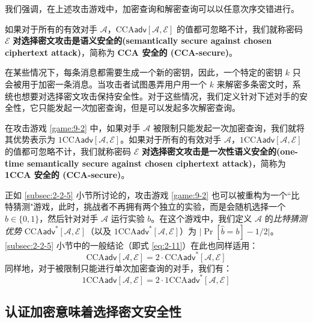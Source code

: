 我们强调，在上述攻击游戏中，加密查询和解密查询可以以任意次序交错进行。

\begin{definition}\label{def:9-5}
如果对于所有的有效对手 $\mathcal{A}$，$\mathrm{CCA}\mathsf{adv}[\mathcal{A},\mathcal{E}]$ 的值都可忽略不计，我们就称密码 $\mathcal{E}$ \textbf{对选择密文攻击是语义安全的(semantically secure against chosen ciphertext attack)}，简称为 \textbf{CCA 安全的 (CCA-secure)}。
\end{definition}

在某些情况下，每条消息都需要生成一个新的密钥，因此，一个特定的密钥 $k$ 只会被用于加密一条消息。当攻击者试图愚弄用户用一个 $k$ 来解密多条密文时，系统也想要对选择密文攻击保持安全性。对于这些情况，我们定义针对下述对手的安全性，它只能发起\emph{一次}加密查询，但是可以发起多次解密查询。

\begin{definition}\label{def:9-6}
在攻击游戏 \ref{game:9-2} 中，如果对手 $\mathcal{A}$ 被限制只能发起一次加密查询，我们就将其优势表示为 $\mathrm{1CCA}\mathsf{adv}[\mathcal{A},\mathcal{E}]$。如果对于所有的有效对手 $\mathcal{A}$，$\mathrm{1CCA}\mathsf{adv}[\mathcal{A},\mathcal{E}]$ 的值都可忽略不计，我们就称密码 $\mathcal{E}$ \textbf{对选择密文攻击是一次性语义安全的(one-time semantically secure against chosen ciphertext attack)}，简称为 \textbf{1CCA 安全的 (CCA-secure)}。
\end{definition}

正如 \ref{subsec:2-2-5} 小节所讨论的，攻击游戏 \ref{game:9-2} 也可以被重构为一个``比特猜测"游戏，此时，挑战者不再拥有两个独立的实验，而是会随机选择一个 $b\in\{0,1\}$，然后针对对手 $\mathcal{A}$ 运行实验 $b$。在这个游戏中，我们定义 $\mathcal{A}$ 的\emph{比特猜测优势} $\mathrm{CCA}\mathsf{adv}^*[\mathcal{A},\mathcal{E}]$（以及 $\mathrm{1CCA}\mathsf{adv}^*[\mathcal{A},\mathcal{E}]$）为 $\lvert\Pr[\hat{b}=b]-1/2\lvert$。\ref{subsec:2-2-5} 小节中的一般结论（即式 \ref{eq:2-11}）在此也同样适用：
\begin{equation}\label{eq:9-1}
\mathrm{CCA}\mathsf{adv}[\mathcal{A},\mathcal{E}]
=
2\cdot
\mathrm{CCA}\mathsf{adv}^*[\mathcal{A},\mathcal{E}]
\end{equation}
同样地，对于被限制只能进行单次加密查询的对手，我们有：
\begin{equation}\label{eq:9-2}
\mathrm{1CCA}\mathsf{adv}[\mathcal{A},\mathcal{E}]
=
2\cdot
\mathrm{1CCA}\mathsf{adv}^*[\mathcal{A},\mathcal{E}]
\end{equation}

\subsection{认证加密意味着选择密文安全性}\label{subsec:9-2-3}

